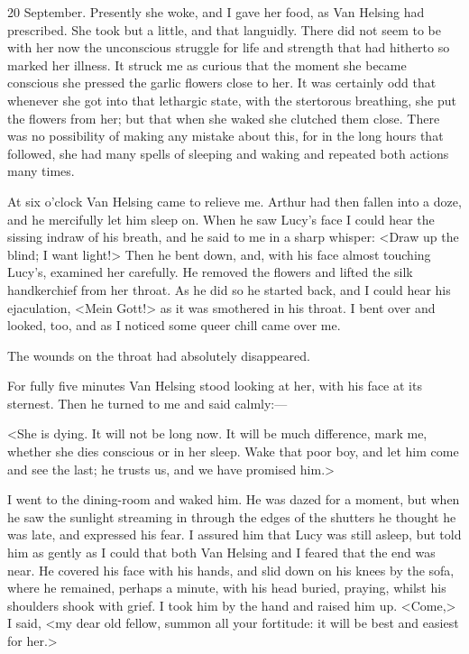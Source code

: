 \begin{diary}{20 September.}
Presently she woke, and I gave her food, as Van Helsing had prescribed. She took but a little, and that languidly. There did not seem to be with her now the unconscious struggle for life and strength that had hitherto so marked her illness. It struck me as curious that the moment she became conscious she pressed the garlic flowers close to her. It was certainly odd that whenever she got into that lethargic state, with the stertorous breathing, she put the flowers from her; but that when she waked she clutched them close. There was no possibility of making any mistake about this, for in the long hours that followed, she had many spells of sleeping and waking and repeated both actions many times.

At six o'clock Van Helsing came to relieve me. Arthur had then fallen into a doze, and he mercifully let him sleep on. When he saw Lucy's face I could hear the sissing indraw of his breath, and he said to me in a sharp whisper: <Draw up the blind; I want light!> Then he bent down, and, with his face almost touching Lucy's, examined her carefully. He removed the flowers and lifted the silk handkerchief from her throat. As he did so he started back, and I could hear his ejaculation, <Mein Gott!> as it was smothered in his throat. I bent over and looked, too, and as I noticed some queer chill came over me.

The wounds on the throat had absolutely disappeared.

For fully five minutes Van Helsing stood looking at her, with his face at its sternest. Then he turned to me and said calmly:—

<She is dying. It will not be long now. It will be much difference, mark me, whether she dies conscious or in her sleep. Wake that poor boy, and let him come and see the last; he trusts us, and we have promised him.>

I went to the dining-room and waked him. He was dazed for a moment, but when he saw the sunlight streaming in through the edges of the shutters he thought he was late, and expressed his fear. I assured him that Lucy was still asleep, but told him as gently as I could that both Van Helsing and I feared that the end was near. He covered his face with his hands, and slid down on his knees by the sofa, where he remained, perhaps a minute, with his head buried, praying, whilst his shoulders shook with grief. I took him by the hand and raised him up. <Come,> I said, <my dear old fellow, summon all your fortitude: it will be best and easiest for her.>


\end{diary}
